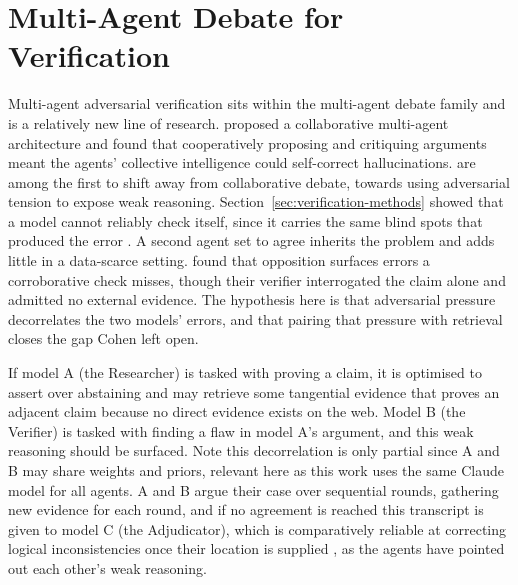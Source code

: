 \section{Multi-Agent Debate for Verification}\label{sec:debate}

Multi-agent adversarial verification sits within the multi-agent debate family and is a relatively new line of research. \citet{du2023} proposed a collaborative multi-agent architecture and found that cooperatively proposing and critiquing arguments meant the agents' collective intelligence could self-correct hallucinations. \citet{liang2023} are among the first to shift away from collaborative debate, towards using adversarial tension to expose weak reasoning. Section~\ref{sec:verification-methods} showed that a model cannot reliably check itself, since it carries the same blind spots that produced the error \citep{huang2024,tyen2024}. A second agent set to agree inherits the problem and adds little in a data-scarce setting. \citet{cohen2023} found that opposition surfaces errors a corroborative check misses, though their verifier interrogated the claim alone and admitted no external evidence. The hypothesis here is that adversarial pressure decorrelates the two models' errors, and that pairing that pressure with retrieval closes the gap Cohen left open.

If model A (the Researcher) is tasked with proving a claim, it is optimised to assert over abstaining \citep{kalai2025} and may retrieve some tangential evidence that proves an adjacent claim because no direct evidence exists on the web. Model B (the Verifier) is tasked with finding a flaw in model A's argument, and this weak reasoning should be surfaced. Note this decorrelation is only partial since A and B may share weights and priors, relevant here as this work uses the same Claude model for all agents. A and B argue their case over sequential rounds, gathering new evidence for each round, and if no agreement is reached this transcript is given to model C (the Adjudicator), which is comparatively reliable at correcting logical inconsistencies once their location is supplied \citep{tyen2024}, as the agents have pointed out each other's weak reasoning.

